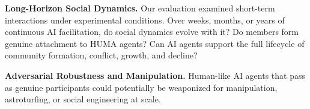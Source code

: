\documentclass[twocolumn,10pt]{article}
\begin{document}
\textbf{Long-Horizon Social Dynamics.} Our evaluation examined short-term interactions under experimental conditions. Over weeks, months, or years of continuous AI facilitation, do social dynamics evolve with it? Do members form genuine attachment to HUMA agents? Can AI agents support the full lifecycle of community formation, conflict, growth, and decline?

\textbf{Adversarial Robustness and Manipulation.} Human-like AI agents that pass as genuine participants could potentially be weaponized for manipulation, astroturfing, or social engineering at scale. 



\end{document}
